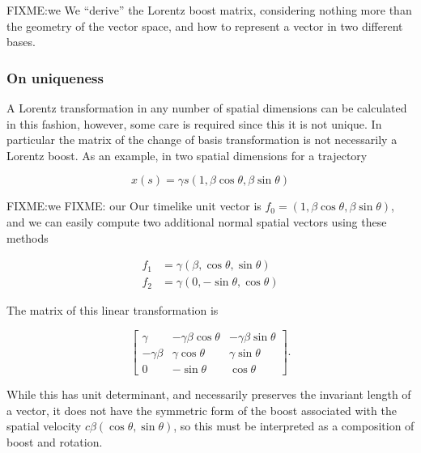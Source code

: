 FIXME:we
We ``derive'' the Lorentz boost matrix, considering nothing more than the geometry of the vector space, and how to represent a vector in two different bases.

\subsubsection{On uniqueness}

A Lorentz transformation in any number of spatial dimensions can be calculated in this fashion, however, some care is required since this it is not unique.  In particular the matrix of the change of basis transformation is not necessarily a Lorentz boost.  As an example, in two spatial dimensions for a trajectory

\begin{equation}\label{eqn:grahamSchmidtLorentz:800}
x(s) = \gamma s ( 1, \beta \cos\theta, \beta \sin\theta)
\end{equation}

FIXME:we
FIXME: our
Our timelike unit vector is $f_0 = ( 1, \beta \cos\theta, \beta \sin\theta )$, and we can easily compute two additional normal spatial vectors using these methods

\begin{align}\label{eqn:grahamSchmidtLorentz:820}
f_1 &= \gamma ( \beta, \cos\theta, \sin\theta ) \\
f_2 &= \gamma ( 0, -\sin\theta, \cos\theta )
\end{align}

The matrix of this linear transformation is

\begin{equation}\label{eqn:grahamSchmidtLorentz:840}
\begin{bmatrix}
\gamma & - \gamma \beta \cos\theta & - \gamma \beta \sin\theta \\
-\gamma \beta & \gamma \cos\theta & \gamma \sin\theta \\
0 & -\sin\theta & \cos\theta
\end{bmatrix}.
\end{equation}

While this has unit determinant, and necessarily preserves the invariant length of a vector, it does not have the symmetric form of the boost associated with the spatial velocity $c \beta (\cos\theta, \sin\theta)$, so this must be interpreted as a composition of boost and rotation.


